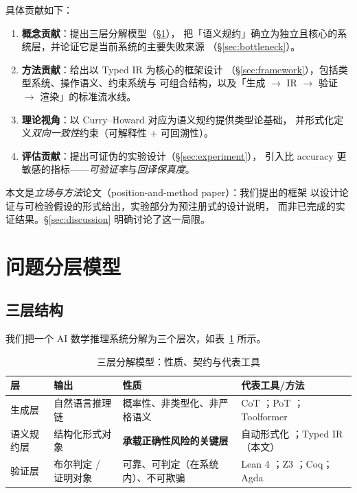 \documentclass[UTF8,a4paper,11pt]{ctexart}
\begin{document}
具体贡献如下：
\begin{enumerate}[leftmargin=1.6em,itemsep=2pt]
  \item \textbf{概念贡献}：提出三层分解模型（\S\ref{sec:model}），
        把「语义规约」确立为独立且核心的系统层，并论证它是当前系统的主要失败来源
        （\S\ref{sec:bottleneck}）。
  \item \textbf{方法贡献}：给出以 Typed IR 为核心的框架设计
        （\S\ref{sec:framework}），包括类型系统、操作语义、约束系统与
        可组合结构，以及「生成 $\to$ IR $\to$ 验证 $\to$ 渲染」的标准流水线。
  \item \textbf{理论视角}：以 Curry--Howard 对应为语义规约提供类型论基础，
        并形式化定义\emph{双向一致性}约束（可解释性 + 可回溯性）。
  \item \textbf{评估贡献}：提出可证伪的实验设计（\S\ref{sec:experiment}），
        引入比 accuracy 更敏感的指标——\emph{可验证率}与\emph{回译保真度}。
\end{enumerate}

本文是\emph{立场与方法}论文（position-and-method paper）：我们提出的框架
以设计论证与可检验假设的形式给出，实验部分为预注册式的设计说明，
而非已完成的实证结果。\S\ref{sec:discussion} 明确讨论了这一局限。

\section{问题分层模型}\label{sec:model}

\subsection{三层结构}

我们把一个 AI 数学推理系统分解为三个层次，如表~\ref{tab:layers} 所示。

\begin{table}[htbp]
\centering
\caption{三层分解模型：性质、契约与代表工具}
\label{tab:layers}
\small
\begin{tabular}{@{}p{2.3cm}p{3.4cm}p{3.6cm}p{4.2cm}@{}}
\toprule
\textbf{层} & \textbf{输出} & \textbf{性质} & \textbf{代表工具/方法} \\
\midrule
生成层
  & 自然语言推理链
  & 概率性、非类型化、非严格语义
  & CoT \citep{wei2022cot}；PoT \citep{chen2023pot}；Toolformer \citep{schick2023toolformer} \\
\addlinespace
语义规约层
  & 结构化形式对象
  & \textbf{承载正确性风险的关键层}
  & 自动形式化 \citep{wu2022autoformalization}；Typed IR（本文）\\
\addlinespace
验证层
  & 布尔判定 / 证明对象
  & 可靠、可判定（在系统内）、不可欺骗
  & Lean 4 \citep{demoura2021lean4}；Z3 \citep{demoura2008z3}；Coq；Agda \\
\bottomrule
\end{tabular}
\end{table}
\end{document}

